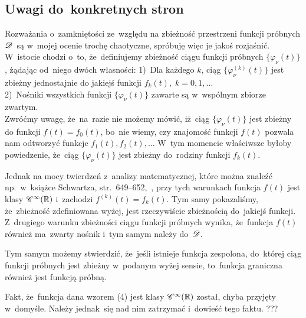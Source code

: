 \documentclass[a4paper,11pt]{article}
\numberwithin{equation}{section}
\begin{document}
\subsection{Uwagi do~konkretnych stron}

\label{sec:Uwagi-do-konkrentych-stron}



\noindent
{} Rozważania o~zamkniętości ze~względu na zbieżność
przestrzeni funkcji próbnych $\mathcal{D}$~są w~mojej ocenie trochę
chaotyczne, spróbuję więc je jakoś rozjaśnić. W~istocie chodzi o~to,
że~definiujemy zbieżność ciągu funkcji próbnych
$\{ \varphi_{ \nu }( t ) \}$, żądając od~niego dwóch własności:
1)~Dla każdego $k$, ciąg $\{ \varphi_{ \nu }^{ ( k ) }( t ) \}$ jest
zbieżny jednostajnie do jakiejś funkcji
$f_{ k }( t ), \; k = 0, 1, \ldots$ \\
2)~Nośniki wszystkich funkcji $\{ \varphi_{ \nu }( t ) \}$ zawarte są
w~wspólnym zbiorze zwartym. \\
Zwróćmy uwagę, że~na~razie nie możemy mówić, iż~ciąg
$\{ \varphi_{ \nu }( t ) \}$ jest zbieżny do funkcji
$f( t ) = f_{ 0 }( t )$, bo~nie wiemy, czy znajomość funkcji $f( t )$
pozwala nam odtworzyć funkcje $f_{ 1 }( t ), f_{ 2 }( t ), \ldots$ W~tym
momencie właściwsze byłoby powiedzenie, że~ciąg
$\{ \varphi_{ \nu }( t ) \}$ jest zbieżny do~rodziny funkcji
$f_{ k }( t )$.

Jednak na mocy twierdzeń z~analizy matematycznej, które można znaleźć
np.~w~książce Schwartza, str.~649--652,~\cite{SchwartzKursAnalizyMatematycznejVolI1979}, przy tych
warunkach funkcja $f( t )$ jest klasy $\mathcal{C}^{ \infty }( \mathbb{R} )$ i~zachodzi
$f^{ ( k ) }( t ) = f_{ k }( t )$. Tym samy pokazaliśmy, że~zbieżność
zdefiniowana wyżej, jest rzeczywiście zbieżnością do~jakiejś funkcji.
Z~drugiego warunku zbieżności ciągu funkcji próbnych wynika,
że~funkcja $f( t )$ również ma~zwarty nośnik i~tym samym należy
do~$\mathcal{D}$.

Tym samym możemy stwierdzić, że~jeśli istnieje funkcja zespolona,
do~której ciąg funkcji próbnych jest zbieżny w~podanym wyżej sensie,
to~funkcja graniczna również jest funkcją próbną.

\VerSpaceFour





\noindent
{} Fakt, że~funkcja dana wzorem (4) jest klasy
$\mathcal{C}^{ \infty }( \mathbb{R} )$ został, chyba przyjęty w~domyśle. Należy jednak~się
nad nim zatrzymać i~dowieść tego faktu. ???
\end{document}
